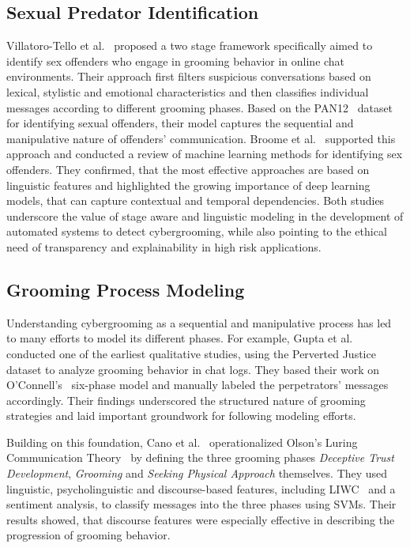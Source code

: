 \subsection{Sexual Predator Identification}
Villatoro-Tello et al.~\cite{villatoro2012two} proposed a two stage framework specifically aimed to identify sex offenders who engage in grooming behavior in online chat environments. Their approach first filters suspicious conversations based on lexical, stylistic and emotional characteristics and then classifies individual messages according to different grooming phases. Based on the PAN12~\cite{inches2012pan} dataset for identifying sexual offenders, their model captures the sequential and manipulative nature of offenders' communication. Broome et al.~\cite{broome2020psycholinguistic} supported this approach and conducted a review of machine learning methods for identifying sex offenders. They confirmed, that the most effective approaches are based on linguistic features and highlighted the growing importance of deep learning models, that can capture contextual and temporal dependencies. Both studies underscore the value of stage aware and linguistic modeling in the development of automated systems to detect cybergrooming, while also pointing to the ethical need of transparency and explainability in high risk applications.


\subsection{Grooming Process Modeling}
Understanding cybergrooming as a sequential and manipulative process has led to many efforts to model its different phases. For example, Gupta et al.~\cite{gupta2012characterizingpedophileconversationsinternet} conducted one of the earliest qualitative studies, using the Perverted Justice dataset to analyze grooming behavior in chat logs. They based their work on O'Connell's~\cite{oconnell2003typology} six-phase model and manually labeled the perpetrators' messages accordingly. Their findings underscored the structured nature of grooming strategies and laid important groundwork for following modeling efforts. %

Building on this foundation, Cano et al.~\cite{Cano2014} operationalized Olson's Luring Communication Theory~\cite{olsonluring2007} by defining the three grooming phases \textit{Deceptive Trust Development}, \textit{Grooming} and \textit{Seeking Physical Approach} themselves. They used linguistic, psycholinguistic and discourse-based features, including LIWC~\cite{tausczik2010psychological} and a sentiment analysis, to classify messages into the three phases using SVMs. Their results showed, that discourse features were especially effective in describing the progression of grooming behavior.  %

